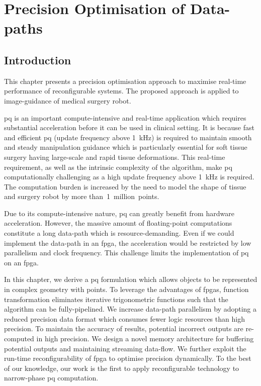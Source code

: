 
\chapter[Precision Optimisation of Data-paths]{Precision Optimisation of Data-paths}

\label{ch:precision}

\section{Introduction}
\label{sec:precision_intro}

This chapter presents a precision optimisation approach to maximise real-time performance of reconfigurable systems.
The proposed approach is applied to image-guidance of medical surgery robot.

\gls{pq} is an important compute-intensive and real-time application which requires substantial acceleration before it can be used in clinical setting.
It is because fast and efficient \gls{pq} (update frequency above 1~kHz) is required to maintain smooth and steady manipulation guidance which is particularly essential for soft tissue surgery having large-scale and rapid tissue deformations.
This real-time requirement, as well as the intrinsic complexity of the algorithm, make \gls{pq} computationally challenging as a high update frequency above 1~kHz is required. 
The computation burden is increased by the need to model the shape of tissue and surgery robot by more than~1~million~points.

Due to its compute-intensive nature, \gls{pq} can greatly benefit from hardware acceleration.
However, the massive amount of floating-point computations constitute a long data-path which is resource-demanding.
Even if we could implement the data-path in an \gls{fpga}, the acceleration would be restricted by low parallelism and clock frequency.
This challenge limits the implementation of \gls{pq} on an \gls{fpga}.

In this chapter, we derive a \gls{pq} formulation which allows objects to be represented in complex geometry with points.
To leverage the advantages of \gls{fpga}s, function transformation eliminates iterative trigonometric functions such that the algorithm can be fully-pipelined.
We increase data-path parallelism by adopting a reduced precision data format which consumes fewer logic resources than high precision.
To maintain the accuracy of results, potential incorrect outputs are re-computed in high precision.
We design a novel memory architecture for buffering potential outputs and maintaining streaming data-flow.
We further exploit the run-time reconfigurability of \gls{fpga} to optimise precision dynamically.
To the best of our knowledge, our work is the first to apply reconfigurable technology to narrow-phase \gls{pq} computation.

